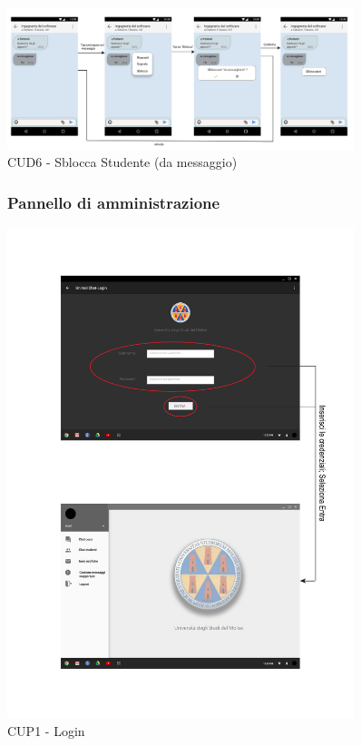 \begin{figure}
	\centering
	\includegraphics[width=0.9\textwidth]{imgs/gruppo6/activities/act_cud6_sblocca_da_messaggio.pdf}
	\caption{CUD6 - Sblocca Studente (da messaggio)}
	\label{fig:act-cud6-2}
\end{figure}

\pagebreak
\begin{figure}
	\subsubsection{Pannello di amministrazione}
	\centering
	\includegraphics[width=0.9\textwidth]{imgs/gruppo6/activities/act_cup1_login.pdf}
	\caption{CUP1 - Login}
	\label{fig:act-cup1}
\end{figure}

